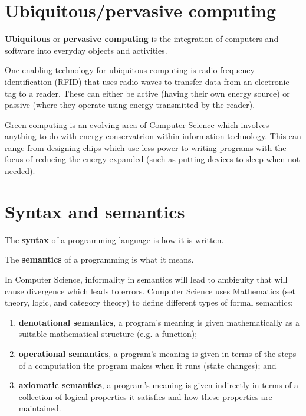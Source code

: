\section{Ubiquitous/pervasive computing}

\begin{definition}
    \textbf{Ubiquitous} or \textbf{pervasive computing} is the integration of computers and software into everyday objects and activities.
\end{definition}

One enabling technology for ubiquitous computing is radio frequency identification (RFID) that uses radio waves to transfer data from an electronic tag to a reader. These can either be active (having their own energy source) or passive (where they operate using energy transmitted by the reader). 

Green computing is an evolving area of Computer Science which involves anything to do with energy conservatrion within information technology. This can range from designing chips which use less power to writing programs with the focus of reducing the energy expanded (such as putting devices to sleep when not needed).

\section{Syntax and semantics}

\begin{definition}
    The \textbf{syntax} of a programming language is how it is written.
\end{definition}

\begin{definition}
    The \textbf{semantics} of a programming is what it means.
\end{definition}

In Computer Science, informality in semantics will lead to ambiguity that will cause divergence which leads to errors. Computer Science uses Mathematics (set theory, logic, and category theory) to define different types of formal semantics:

\begin{enumerate}
    \item \textbf{denotational semantics}, a program's meaning is given mathematically as a suitable mathematical structure (e.g. a function);
    
    \item \textbf{operational semantics}, a program's meaning is given in terms of the steps of a computation the program makes when it runs (state changes); and
    
    \item \textbf{axiomatic semantics}, a program's meaning is given indirectly in terms of a collection of logical properties it satisfies and how these properties are maintained.
\end{enumerate}

